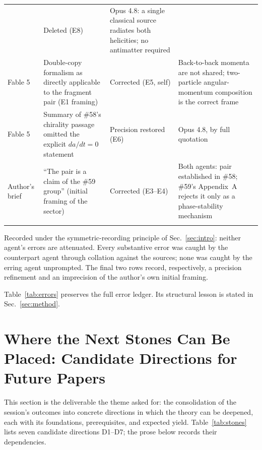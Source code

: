 \documentclass[%
 reprint, amsmath,amssymb, aps, prb, ]{revtex4-2}
\numberwithin{equation}{section}
\begin{document}
\begin{table}[t!]
\begin{tabular}{p{1.8cm}p{6.6cm}p{2.6cm}p{3.6cm}}
& Deleted (E8)
& Opus 4.8: a single classical source radiates both helicities; no antimatter required \\
\addlinespace[0.3cm]
Fable 5
& Double-copy formalism as directly applicable to the fragment pair (E1 framing)
& Corrected (E5, self)
& Back-to-back momenta are not shared; two-particle angular-momentum composition is the correct frame \\
\addlinespace[0.3cm]
Fable 5
& Summary of \#58's chirality passage omitted the explicit $da/dt=0$ statement
& Precision restored (E6)
& Opus 4.8, by full quotation \\
\addlinespace[0.3cm]
Author's brief
& ``The pair is a claim of the \#59 group'' (initial framing of the sector)
& Corrected (E3--E4)
& Both agents: pair established in \#58; \#59's Appendix~A rejects it only as a phase-stability mechanism \\
\addlinespace[0.2cm]
\bottomrule
\end{tabular}
\vspace{0.2cm}
\begin{minipage}{0.95\textwidth}
\justifying\footnotesize
Recorded under the symmetric-recording principle of Sec.~\ref{sec:intro}: neither agent's errors are attenuated. Every substantive error was caught by the counterpart agent through collation against the sources; none was caught by the erring agent unprompted. The final two rows record, respectively, a precision refinement and an imprecision of the author's own initial framing.
\end{minipage}
\end{table}

Table~\ref{tab:errors} preserves the full error ledger. Its structural lesson is stated in Sec.~\ref{sec:method}.

\section{Where the Next Stones Can Be Placed: Candidate Directions for Future Papers}
\label{sec:stones}

This section is the deliverable the theme asked for: the consolidation of the session's outcomes into concrete directions in which the theory can be deepened, each with its foundations, prerequisites, and expected yield. Table~\ref{tab:stones} lists seven candidate directions D1--D7; the prose below records their dependencies.
\end{document}
